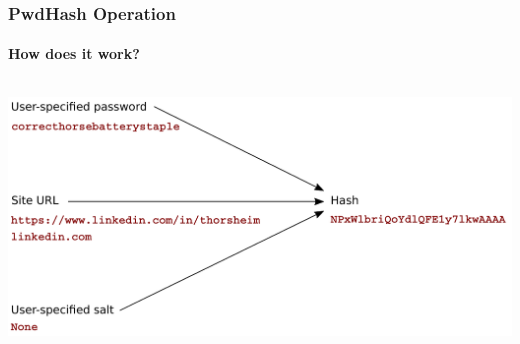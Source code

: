 \documentclass[handout, notes=hide]{beamer}
\begin{document}

\begin{frame}
\frametitle{PwdHash Operation}
\framesubtitle{How does it work?}
\setlength{\parskip}{0.5em}

\begin{columns}[T]
\begin{column}[T]{1.1\textwidth}
\vspace{0.0em}
\includegraphics[width=1.0\textwidth]{process04}
\end{column}
\end{columns}


\end{frame}
\note{
\setlength{\parskip}{0.5em}
}

\end{document}
